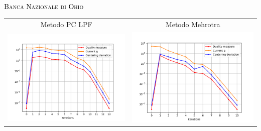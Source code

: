 \begin{frame}{\textsc{\LARGE \textcolor{black}{Banca Nazionale di Ohio}}}
	\centering
	\begin{tabular}{c@{}c}
		\small{Metodo PC LPF} & \small{Metodo Mehrotra} \\
		\includegraphics[scale = 0.33]{onb_MER2}
		&\includegraphics[scale = 0.33]{onb_MER}\\ 
	\end{tabular}
\end{frame}


